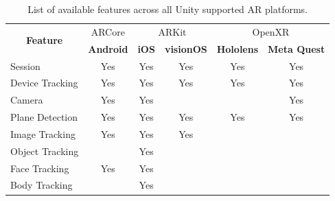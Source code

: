 \documentclass{l4proj}
\begin{document}
\begin{table}[hbt!]
\caption{List of available features across all Unity supported AR platforms. \cite{noauthor_ar_nodate}}
\label{tab:arfFeatures}
\centering
{}
\begin{tabular}{|l|c|cc|cc|}
\hline
\multicolumn{1}{|c|}{\multirow{2}{*}{\textbf{Feature}}} & ARCore           & \multicolumn{2}{c|}{ARKit}                            & \multicolumn{2}{c|}{OpenXR}                                  \\ \cline{2-6} 
\multicolumn{1}{|c|}{}                                  & \textbf{Android} & \multicolumn{1}{c|}{\textbf{iOS}} & \textbf{visionOS} & \multicolumn{1}{c|}{\textbf{Hololens}} & \textbf{Meta Quest} \\ \hline
Session                                                 & Yes              & \multicolumn{1}{c|}{Yes}          & Yes               & \multicolumn{1}{c|}{Yes}               & Yes                 \\
Device Tracking                                         & Yes              & \multicolumn{1}{c|}{Yes}          & Yes               & \multicolumn{1}{c|}{Yes}               & Yes                 \\
Camera                                                  & Yes              & \multicolumn{1}{c|}{Yes}          &                   & \multicolumn{1}{c|}{}                  & Yes                 \\
Plane Detection                                         & Yes              & \multicolumn{1}{c|}{Yes}          & Yes               & \multicolumn{1}{c|}{Yes}               & Yes                 \\
Image Tracking                                          & Yes              & \multicolumn{1}{c|}{Yes}          & Yes               & \multicolumn{1}{c|}{}                  &                     \\
Object Tracking                                         &                  & \multicolumn{1}{c|}{Yes}          &                   & \multicolumn{1}{c|}{}                  &                     \\
Face Tracking                                           & Yes              & \multicolumn{1}{c|}{Yes}          &                   & \multicolumn{1}{c|}{}                  &                     \\
Body Tracking                                           &                  & \multicolumn{1}{c|}{Yes}          &                   & \multicolumn{1}{c|}{}                  &                     \\

\end{tabular}
\end{table}
\end{document}
